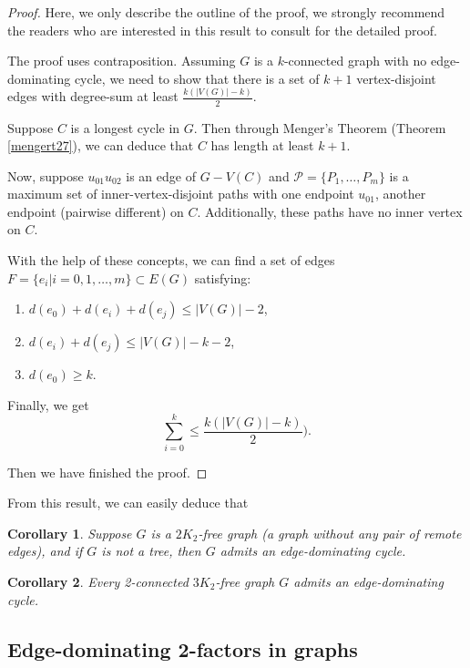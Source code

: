 \documentclass[12pt]{report}
\newtheorem{corollary}{Corollary}
\begin{document}
\begin{proof}
Here, we only describe the outline of the proof, we strongly recommend the readers who are interested in this result to consult \cite{veldman1983existence} for the detailed proof.

The proof uses contraposition. Assuming $G$ is a $k$-connected graph with no edge-dominating cycle, we need to show that there is a set of $k+1$ vertex-disjoint edges with degree-sum at least $\frac{k(|V(G)|-k)}{2}$.

Suppose $C$ is a longest cycle in $G$. Then through Menger's Theorem (Theorem \ref{mengert27}), we can deduce that $C$ has length at least $k+1$.

Now, suppose $u_{01}u_{02}$ is an edge of $G-V(C)$ and $\mathcal{P}=\{P_1,\ldots,P_m\}$ is a maximum set of inner-vertex-disjoint  paths with one endpoint $u_{01}$, another endpoint (pairwise different) on $C$. Additionally, these paths have no inner vertex on $C$.


With the help of these concepts, we can find a set of edges $F=\{e_i|i=0,1,\ldots,m\}\subset E(G)$ satisfying:
\begin{enumerate}
\item $d(e_0)+d(e_i)+d(e_j)\le|V(G)|-2$,
\item $d(e_i)+d(e_j)\le|V(G)|-k-2$,
\item $d(e_0)\ge k$.
\end{enumerate}

Finally, we get $$\sum^k_{i=0}\le\frac{k(|V(G)|-k)}{2}).$$

Then we have finished the proof.

\end{proof}

From this result, we can easily deduce that

\begin{corollary}\label{cor2k2edgd}
Suppose $G$ is a $2K_2$-free graph (a graph without any pair of remote edges), and if $G$ is not a tree, then $G$ admits an edge-dominating cycle.
\end{corollary}

\begin{corollary}\label{co32c3kfed}
Every 2-connected $3K_2$-free graph $G$ admits an edge-dominating cycle.
\end{corollary}



\subsection{Edge-dominating 2-factors in graphs}
\end{document}

